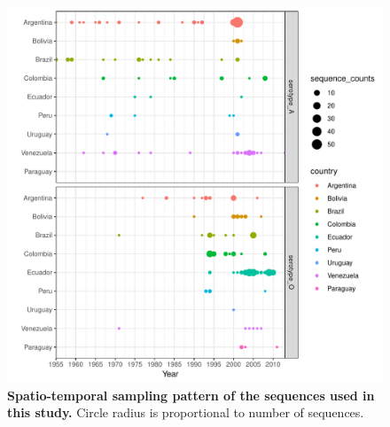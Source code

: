 \documentclass[a4paper,10pt]{article}
\begin{document}


\newpage
\begin{center}
\begin{figure}[H]
\begin{center}
\includegraphics[scale=.80]{FIGURES/PLOTS/sampling_bubble_plot.pdf}
\end{center}
\caption{
\textbf{Spatio-temporal sampling pattern of the sequences used in this study.} Circle radius is proportional to number of sequences.
}
\label{sfig:sampling}
\end{figure}
\end{center}
\newpage
\end{document}
